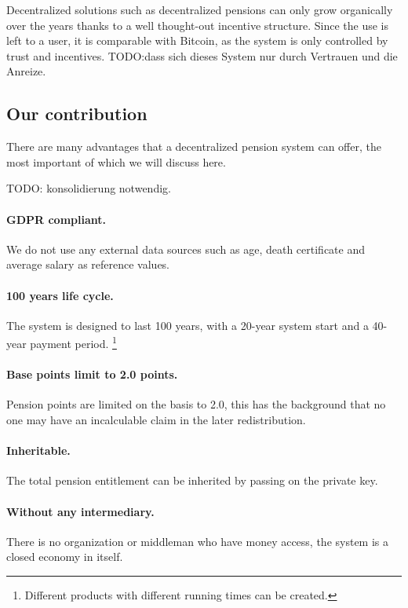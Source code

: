 Decentralized solutions such as decentralized pensions can only grow organically over the years thanks to a well thought-out incentive structure. Since the use is left to a user, it is comparable with Bitcoin\cite{nakamoto2012bitcoin}, as the system is only controlled by trust and incentives.
TODO:dass sich dieses System nur durch Vertrauen und die Anreize.

\subsection{Our contribution}
There are many advantages that a decentralized pension system can offer, the most important of which we will discuss here.


TODO: konsolidierung notwendig.

\paragraph{GDPR\cite{gdpr} compliant.} 
We do not use any external data sources such as age, death certificate and average salary as reference values.

\paragraph{100 years life cycle.} 
The system is designed to last 100 years, with a 20-year system start and a 40-year payment period. \footnote{ Different products with different running times can be created.} 

\paragraph{Base points limit to 2.0 points.} 
Pension points are limited on the basis to 2.0, this has the background that no one may have an incalculable claim in the later redistribution.

\paragraph{Inheritable.} 
The total pension entitlement can be inherited by passing on the private key.

\paragraph{Without any intermediary.} 
There is no organization or middleman who have money access, the system is a closed economy in itself.

